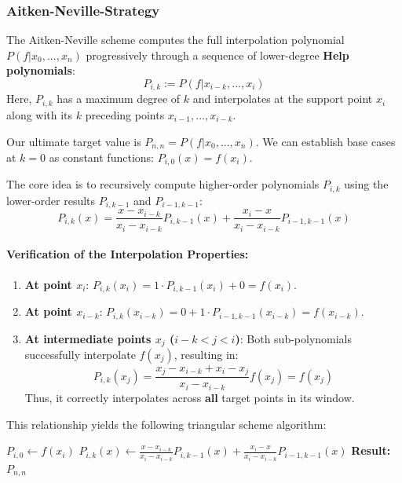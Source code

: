\documentclass{article}
\begin{document}
\subsubsection{Aitken-Neville-Strategy}
The Aitken-Neville scheme computes the full interpolation polynomial $P(f|x_0,...,x_n)$ progressively through a sequence of lower-degree \textbf{Help polynomials}:
\[P_{i,k} := P(f|x_{i-k},...,x_i)\]
Here, $P_{i,k}$ has a maximum degree of $k$ and interpolates at the support point $x_i$ along with its $k$ preceding points $x_{i-1},...,x_{i-k}$.

Our ultimate target value is $P_{n,n} = P(f|x_0,...,x_n)$. 
We can establish base cases at $k=0$ as constant functions: $P_{i,0}(x) = f(x_i)$.

The core idea is to recursively compute higher-order polynomials $P_{i,k}$ using the lower-order results $P_{i,k-1}$ and $P_{i-1,k-1}$:
\[P_{i,k}(x) = \frac{x-x_{i-k}}{x_i-x_{i-k}}P_{i,k-1}(x) + \frac{x_i-x}{x_i-x_{i-k}}P_{i-1,k-1}(x)\]

\paragraph{Verification of the Interpolation Properties:}
\begin{enumerate}
  \item \textbf{At point $x_i$}: $P_{i,k}(x_i) = 1 \cdot P_{i,k-1}(x_i) + 0 = f(x_i)$.
  \item \textbf{At point $x_{i-k}$}: $P_{i,k}(x_{i-k}) = 0 + 1 \cdot P_{i-1,k-1}(x_{i-k}) = f(x_{i-k})$.
  \item \textbf{At intermediate points $x_j$ ($i-k < j < i$)}: Both sub-polynomials successfully interpolate $f(x_j)$, resulting in:
  \[P_{i,k}(x_j) = \frac{x_j-x_{i-k} + x_i-x_j}{x_i-x_{i-k}} f(x_j) = f(x_j)\]
  Thus, it correctly interpolates across \textbf{all} target points in its window.
\end{enumerate}

This relationship yields the following triangular scheme algorithm:
\begin{algorithm}[H]
\begin{algorithmic}[1]
  \State $P_{i,0} \leftarrow f(x_i)$
\EndFor
{}
    \State $P_{i,k}(x) \leftarrow \frac{x-x_{i-k}}{x_i-x_{i-k}}P_{i,k-1}(x) + \frac{x_i-x}{x_i-x_{i-k}}P_{i-1,k-1}(x)$
  \EndFor
\EndFor
\State \textbf{Result:} $P_{n,n}$
\end{algorithmic}
\end{algorithm}
\end{document}
